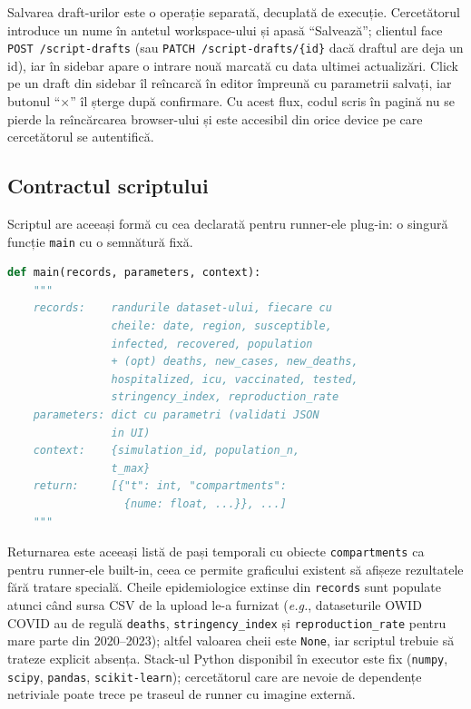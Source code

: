 Salvarea draft-urilor este o operație separată, decuplată de execuție.
Cercetătorul introduce un nume în antetul workspace-ului și apasă
``Salvează''; clientul face \texttt{POST /script-drafts} (sau
\texttt{PATCH /script-drafts/\{id\}} dacă draftul are deja un id), iar în
sidebar apare o intrare nouă marcată cu data ultimei actualizări. Click pe un
draft din sidebar îl reîncarcă în editor împreună cu parametrii salvați, iar
butonul ``×'' îl șterge după confirmare. Cu acest flux, codul scris în pagină
nu se pierde la reîncărcarea browser-ului și este accesibil din orice device
pe care cercetătorul se autentifică.

\subsection{Contractul scriptului}
\label{subsec:editor_contract}

Scriptul are aceeași formă cu cea declarată pentru runner-ele plug-in:
o singură funcție \texttt{main} cu o semnătură fixă.

\begin{lstlisting}[language=Python, caption={Contractul scriptului din editor.}]
def main(records, parameters, context):
    """
    records:    randurile dataset-ului, fiecare cu
                cheile: date, region, susceptible,
                infected, recovered, population
                + (opt) deaths, new_cases, new_deaths,
                hospitalized, icu, vaccinated, tested,
                stringency_index, reproduction_rate
    parameters: dict cu parametri (validati JSON
                in UI)
    context:    {simulation_id, population_n,
                t_max}
    return:     [{"t": int, "compartments":
                  {nume: float, ...}}, ...]
    """
\end{lstlisting}

Returnarea este aceeași listă de pași temporali cu obiecte
\texttt{compartments} ca pentru runner-ele built-in, ceea ce permite graficului
existent să afișeze rezultatele fără tratare specială. Cheile epidemiologice
extinse din \texttt{records} sunt populate atunci când sursa CSV de la upload
le-a furnizat (\emph{e.g.}, dataseturile OWID COVID au de regulă
\texttt{deaths}, \texttt{stringency\_index} și \texttt{reproduction\_rate} pentru
mare parte din 2020--2023); altfel valoarea cheii este \texttt{None}, iar
scriptul trebuie să trateze explicit absența. Stack-ul Python disponibil în
executor este fix (\texttt{numpy}, \texttt{scipy}, \texttt{pandas},
\texttt{scikit-learn}); cercetătorul care are nevoie de dependențe netriviale
poate trece pe traseul de runner cu imagine externă.

